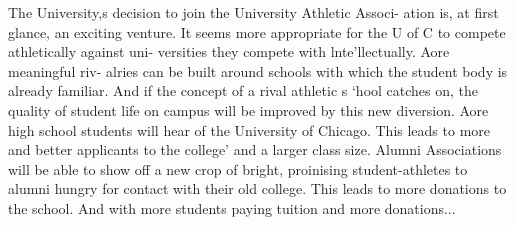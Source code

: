 \documentclass{article}
\begin{document}
\begin{LARGE}
The University,s decision to join the University Athletic Associ-
ation is, at first glance, an exciting venture. It seems more
appropriate for the U of C to compete athletically against uni-
versities they compete with lnte'llectually. Aore meaningful riv-
alries can be built around schools with which the student body is
already familiar. And if the concept of a rival athletic s   `hool
catches on, the quality of student life on campus will be improved by
this new diversion. Aore high school students will hear of the
University of Chicago. This leads to more and better applicants to
the college' and a larger class size. Alumni Associations will be able
to show off a new crop of bright, proinising student-athletes to
alumni hungry for contact with their old college. This leads to more
donations to the school. And with more students paying tuition and
more donations...
\end{LARGE}
\end{document}
